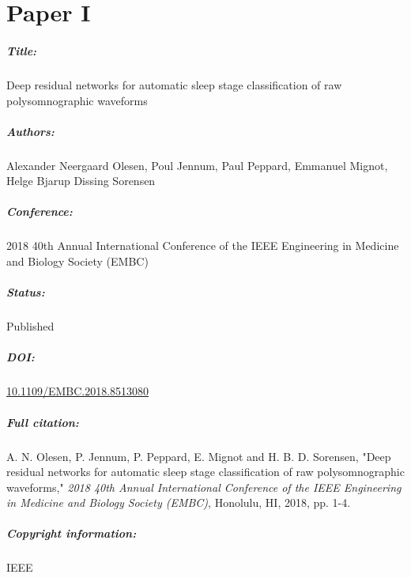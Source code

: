 \chapter{Paper I}

\paragraph{Title:}
Deep residual networks for automatic sleep stage classification of raw polysomnographic waveforms

\paragraph{Authors:}
Alexander Neergaard Olesen, Poul Jennum, Paul Peppard, Emmanuel Mignot, Helge Bjarup Dissing Sorensen

\paragraph{Conference:}
2018 40th Annual International Conference of the IEEE Engineering in Medicine and Biology Society (EMBC)

\paragraph{Status:}
Published

\paragraph{DOI:}
\href{https://doi.org/10.1109/EMBC.2018.8513080}{10.1109/EMBC.2018.8513080}

\paragraph{Full citation:}
A. N. Olesen, P. Jennum, P. Peppard, E. Mignot and H. B. D. Sorensen, "Deep residual networks for automatic sleep stage classification of raw polysomnographic waveforms," \textit{2018 40th Annual International Conference of the IEEE Engineering in Medicine and Biology Society (EMBC)}, Honolulu, HI, 2018, pp. 1-4.

\paragraph{Copyright information:}
 IEEE

